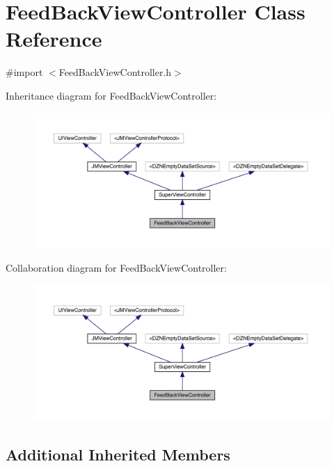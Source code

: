 \hypertarget{interface_feed_back_view_controller}{}\section{Feed\+Back\+View\+Controller Class Reference}
\label{interface_feed_back_view_controller}


{\ttfamily \#import $<$Feed\+Back\+View\+Controller.\+h$>$}



Inheritance diagram for Feed\+Back\+View\+Controller\+:\nopagebreak
\begin{figure}[H]
\begin{center}
\leavevmode
\includegraphics[width=350pt]{interface_feed_back_view_controller__inherit__graph}
\end{center}
\end{figure}


Collaboration diagram for Feed\+Back\+View\+Controller\+:\nopagebreak
\begin{figure}[H]
\begin{center}
\leavevmode
\includegraphics[width=350pt]{interface_feed_back_view_controller__coll__graph}
\end{center}
\end{figure}
\subsection*{Additional Inherited Members}



